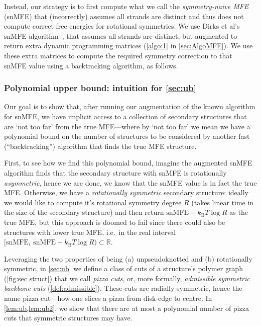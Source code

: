 \documentclass[11pt,letterpaper]{article}  \usepackage[margin=1in]{geometry}
\theoremstyle{definition}  \newtheorem{Definition}[theorem]{Definition}
\newcommand{\snMFE}{snMFE\xspace}
\newcommand{\symnMFE}{symmetry-naive MFE\xspace}
\begin{document}
Instead, our strategy is to first compute what we call the {\em \symnMFE} (\snMFE) that (incorrectly) assumes all strands are distinct and thus does not compute correct free energies for rotational symmetries. 
We use  Dirks et al's \snMFE algorithm~\cite{dirks2007thermodynamic},  that assumes all strands are distinct, but  augmented to return extra dynamic programming matrices (\cref{algo:1} in \cref{sec:AlgoMFE}). 
We use these extra matrices to compute the required symmetry correction to that \snMFE value using a backtracking algorithm, as  follows.



\subsubsection{Polynomial upper bound: intuition for \cref{sec:ub}} 
Our goal is to show that, after running our augmentation of the known algorithm for \snMFE, we have implicit access to a collection of secondary structures that are `not too far' from the true MFE---where by `not too far' we mean we have a polynomial bound on the number of structures to be  considered by another fast (``backtracking'') algorithm that finds the true MFE structure.


First, 
to see how we find this polynomial bound,  imagine  the augmented
\snMFE algorithm finds that the secondary structure with \snMFE is  rotationally {\em  asymmetric}, hence we are done, we know that the \snMFE value is in fact the true MFE. 
Otherwise, we have a {\em rotationally symmetric} secondary structure: ideally we would like to compute it's rotational symmetry degree $R$ (takes linear time in the size of the secondary structure) and then return  $\mathrm{\snMFE} + k_\mathrm{B} T \log R$ as the true MFE, but this approach is doomed to fail since there could also be structures with lower true MFE, i.e.~in the real interval $[\mathrm{\snMFE}, \ \mathrm{\snMFE} + k_\mathrm{B} T \log R) \subset \mathbb{R}$. 



Leveraging the two properties of being (a) unpseudoknotted and (b) rotationally symmetric, in \cref{sec:ub} we define a class of cuts of a structure's polymer graph (\cref{fig:sec struct}) that we call {\em pizza cuts}, or, more formally, \emph{admissible symmetric backbone cuts} (\cref{def:admissible}). 
These cuts are radially symmetric, hence the name pizza cut---how one slices a pizza from disk-edge to centre.
In \cref{lem:ub,lem:ub2}, we show that there are at most a polynomial number of pizza cuts that symmetric structures may have. 
\end{document}
